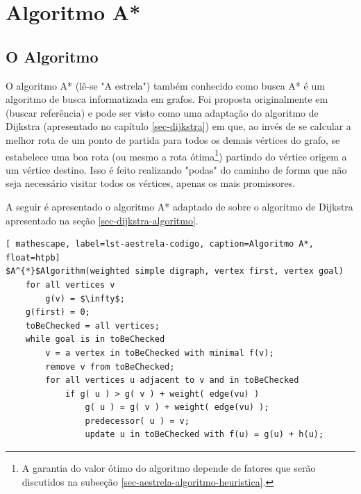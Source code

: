 \chapter{Algoritmo A*}
\label{sec-aestrela}

\section{O Algoritmo}
\label{sec-aestrela-algoritmo}
O algoritmo A* (lê-se "A estrela") também conhecido como busca A* é um algoritmo de busca informatizada em grafos. Foi proposta originalmente em (buscar referência) e pode ser visto como uma adaptação do algoritmo de Dijkstra (apresentado no capítulo \ref{sec-dijkstra}) em que, ao invés de se calcular a melhor rota de um ponto de partida para todos os demais vértices do grafo, se estabelece uma boa rota (ou mesmo a rota ótima\footnote{A garantia do valor ótimo do algoritmo depende de fatores que serão discutidos na subseção \ref{sec-aestrela-algoritmo-heuristica}.}) partindo do vértice origem a um vértice destino. Isso é feito realizando "podas" do caminho de forma que não seja necessário visitar todos os vértices, apenas os mais promissores.

A seguir é apresentado o algoritmo A* adaptado de  sobre o algoritmo de Dijkstra apresentado na seção \ref{sec-dijkstra-algoritmo}. 

\begin{lstlisting}[ mathescape, label=lst-aestrela-codigo, caption=Algoritmo A*, float=htpb]
$A^{*}$Algorithm(weighted simple digraph, vertex first, vertex goal)
	for all vertices v
		g(v) = $\infty$;
	g(first) = 0;
	toBeChecked = all vertices;
	while goal is in toBeChecked
		v = a vertex in toBeChecked with minimal f(v);
		remove v from toBeChecked;
		for all vertices u adjacent to v and in toBeChecked
			if g( u ) > g( v ) + weight( edge(vu) )
				g( u ) = g( v ) + weight( edge(vu) );
				predecessor( u ) = v;
				update u in toBeChecked with f(u) = g(u) + h(u);
\end{lstlisting}

